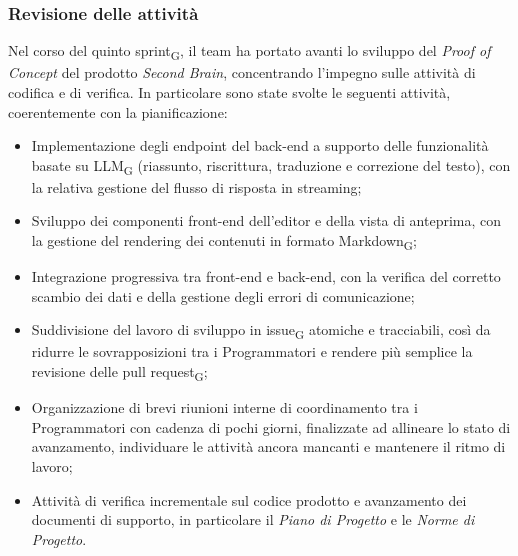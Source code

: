 \documentclass[a4paper, 10pt, colorlinks=true, linkcolor=black, urlcolor=blue, citecolor=blue, hidelinks]{article}
\begin{document}
\subsubsection{Revisione delle attività}
Nel corso del quinto sprint\textsubscript{G}, il team ha portato avanti lo sviluppo del \textit{Proof of Concept} del prodotto \textit{Second Brain}, concentrando l'impegno sulle attività di codifica e di verifica. In particolare sono state svolte le seguenti attività, coerentemente con la pianificazione:
\begin{itemize}
    \item Implementazione degli endpoint del back-end a supporto delle funzionalità basate su LLM\textsubscript{G} (riassunto, riscrittura, traduzione e correzione del testo), con la relativa gestione del flusso di risposta in streaming;
    \item Sviluppo dei componenti front-end dell'editor e della vista di anteprima, con la gestione del rendering dei contenuti in formato Markdown\textsubscript{G};
    \item Integrazione progressiva tra front-end e back-end, con la verifica del corretto scambio dei dati e della gestione degli errori di comunicazione;
    \item Suddivisione del lavoro di sviluppo in issue\textsubscript{G} atomiche e tracciabili, così da ridurre le sovrapposizioni tra i Programmatori e rendere più semplice la revisione delle pull request\textsubscript{G};
    \item Organizzazione di brevi riunioni interne di coordinamento tra i Programmatori con cadenza di pochi giorni, finalizzate ad allineare lo stato di avanzamento, individuare le attività ancora mancanti e mantenere il ritmo di lavoro;
    \item Attività di verifica incrementale sul codice prodotto e avanzamento dei documenti di supporto, in particolare il \textit{Piano di Progetto} e le \textit{Norme di Progetto}.
\end{itemize}
\end{document}
